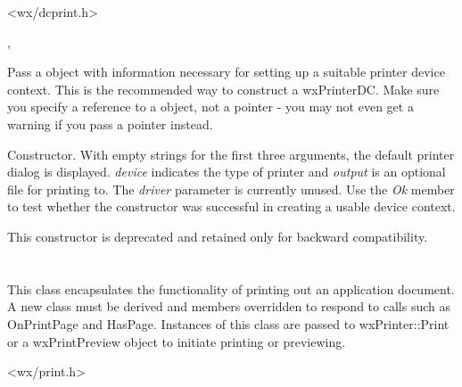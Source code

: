 
<wx/dcprint.h>


, 



\label{wxprinterdcctor}


Pass a  object with information
necessary for setting up a suitable printer device context. This
is the recommended way to construct a wxPrinterDC.  Make sure you 
specify a reference to a  object,
not a pointer - you may not even get a warning if you pass a pointer
instead.


Constructor. With empty strings for the first three arguments, the default printer dialog is
displayed. {\it device} indicates the type of printer and {\it output}
is an optional file for printing to. The {\it driver} parameter is
currently unused.  Use the {\it Ok} member to test whether the
constructor was successful in creating a usable device context.

This constructor is deprecated and retained only for backward compatibility.

\section{}\label{wxprintout}

This class encapsulates the functionality of printing out an
application document. A new class must be derived and members
overridden to respond to calls such as OnPrintPage and HasPage.
Instances of this class are passed to wxPrinter::Print or a
wxPrintPreview object to initiate printing or previewing.




<wx/print.h>

